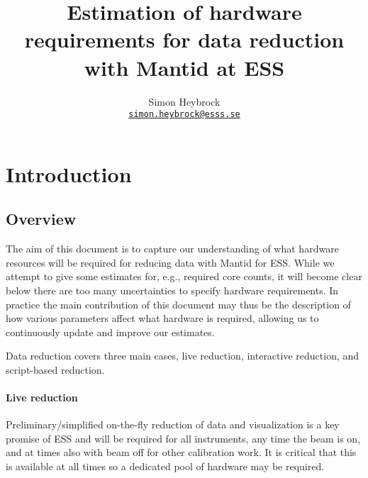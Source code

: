 \documentclass[a4paper,english,numbers=noenddot,bibliography=totoc,chapterprefix=on,DIV=12]{scrartcl}
\newcommand{\mantid}{Mantid\xspace}
\begin{document}
\title{Estimation of hardware requirements for data reduction with \mantid at ESS}
\author{Simon Heybrock\\
    {\small\href{mailto:simon.heybrock@esss.se}{\nolinkurl{simon.heybrock@esss.se}}}}

\maketitle

\tableofcontents

\section{Introduction}
\subsection{Overview}

The aim of this document is to capture our understanding of what hardware resources will be required for reducing data with \mantid for ESS.
While we attempt to give some estimates for, e.g., required core counts, it will become clear below there are too many uncertainties to specify hardware requirements.
In practice the main contribution of this document may thus be the description of how various parameters affect what hardware is required, allowing us to continuously update and improve our estimates.

Data reduction covers three main cases, live reduction, interactive reduction, and script-based reduction.

\paragraph{Live reduction}
Preliminary/simplified on-the-fly reduction of data and visualization is a key promise of ESS and will be required for all instruments, any time the beam is on, and at times also with beam off for other calibration work.
It is critical that this is available at all times so a dedicated pool of hardware may be required.
\end{document}
